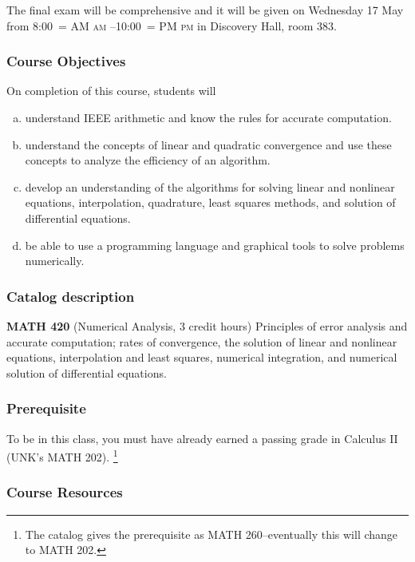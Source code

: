 \documentclass[12pt,fullpage]{article}
\makeatletter
\newcounter{ex}\setcounter{ex}{0}
\newenvironment{alphalist}{
  \begin{enumerate}[(a)]
    \addtolength{\itemsep}{-0.5\itemsep}}
  {\end{enumerate}}
\DeclareRobustCommand{\maybefakesc}[1]{%
  \ifnum\pdfstrcmp{\f@series}{\bfdefault}=\z@
    {\fontsize{\dimexpr0.8\dimexpr\f@size pt\relax}{0}\selectfont\uppercase{#1}}%
  \else
    \textsc{#1}%
  \fi
}
\newcommand\AM{\,\maybefakesc{am}\xspace}
\newcommand\PM{\,\maybefakesc{pm}\xspace}
\newcommand{\room}{Discovery Hall, room  383}
\newcommand{\finalexam}{The final exam will be comprehensive and it 
will be given on Wednesday 17 May \the\year from 8:00\AM{}--10:00\PM}
\makeatother
\begin{document}
\finalexam{} in \room.

\subsubsection*{Course Objectives}

On completion of this course, students will
\begin{alphalist}
    \item understand IEEE arithmetic and know the rules for accurate computation.
    \item understand the concepts of linear and quadratic convergence and use these concepts to analyze 
        the efficiency of an algorithm.
    \item develop an understanding of the algorithms for solving linear and nonlinear equations, interpolation, 
       quadrature, least squares methods, and solution of differential equations.
    \item be able to use a programming language and graphical tools to solve problems 
    numerically.
\end{alphalist}

\subsubsection*{Catalog description}

    \textbf{MATH 420} (Numerical Analysis, 3 credit hours) Principles of
    error analysis and accurate computation; rates of convergence, the solution 
    of linear and nonlinear equations, interpolation and least squares, 
    numerical integration, and numerical solution of differential equations.


\subsubsection*{Prerequisite}

To be in this class, you must have already earned a passing grade in Calculus II (UNK's MATH 202).
\footnote{The catalog gives the prerequisite as MATH 260--eventually this will change to MATH 202.}

\subsubsection*{Course Resources}
\end{document}
